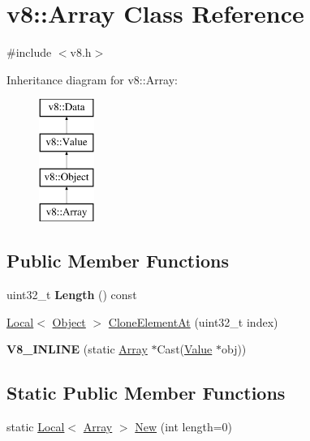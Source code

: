\hypertarget{classv8_1_1_array}{}\section{v8\+:\+:Array Class Reference}
\label{classv8_1_1_array}


{\ttfamily \#include $<$v8.\+h$>$}

Inheritance diagram for v8\+:\+:Array\+:\begin{figure}[H]
\begin{center}
\leavevmode
\includegraphics[height=4.000000cm]{classv8_1_1_array}
\end{center}
\end{figure}
\subsection*{Public Member Functions}
\begin{DoxyCompactItemize}
\item 
\hypertarget{classv8_1_1_array_a3c47dfd8d26e60ed4fcdc683034d6d9c}{}uint32\+\_\+t {\bfseries Length} () const \label{classv8_1_1_array_a3c47dfd8d26e60ed4fcdc683034d6d9c}

\item 
\hyperlink{classv8_1_1_local}{Local}$<$ \hyperlink{classv8_1_1_object}{Object} $>$ \hyperlink{classv8_1_1_array_a7335096a5349ce75b38d5b24af4bd125}{Clone\+Element\+At} (uint32\+\_\+t index)
\item 
\hypertarget{classv8_1_1_array_aa5c59906471b78b58332eefad21727d6}{}{\bfseries V8\+\_\+\+I\+N\+L\+I\+N\+E} (static \hyperlink{classv8_1_1_array}{Array} $\ast$Cast(\hyperlink{classv8_1_1_value}{Value} $\ast$obj))\label{classv8_1_1_array_aa5c59906471b78b58332eefad21727d6}

\end{DoxyCompactItemize}
\subsection*{Static Public Member Functions}
\begin{DoxyCompactItemize}
\item 
static \hyperlink{classv8_1_1_local}{Local}$<$ \hyperlink{classv8_1_1_array}{Array} $>$ \hyperlink{classv8_1_1_array_ac3b086f18d6fd7e41cf28fe90018e877}{New} (int length=0)
\end{DoxyCompactItemize}


